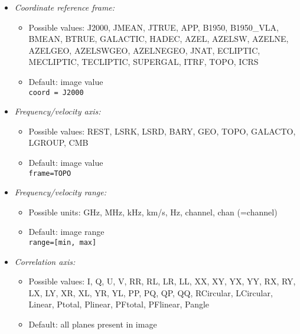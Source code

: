 \begin{itemize}

\item {\it Coordinate reference frame:}
\begin{itemize}

\item Possible values: J2000, JMEAN, JTRUE, APP, B1950, B1950\_VLA, BMEAN, BTRUE, GALACTIC, HADEC, AZEL, AZELSW, AZELNE, AZELGEO, AZELSWGEO, AZELNEGEO, JNAT, ECLIPTIC, MECLIPTIC, TECLIPTIC, SUPERGAL, ITRF, TOPO, ICRS 

\item Default: image value\\

{\tt coord = J2000}

\end{itemize}


\item {\it Frequency/velocity axis:}

\begin{itemize}

\item Possible values: REST, LSRK, LSRD, BARY, GEO, TOPO, GALACTO, LGROUP, CMB
\item Default: image value\\

{\tt frame=TOPO}
\end{itemize}


\item {\it Frequency/velocity range:}
\begin{itemize}

\item Possible units: GHz, MHz, kHz, km/s, Hz, channel, chan (=channel)
\item Default: image range\\

{\tt range=[min, max]}

\end{itemize}

\item {\it Correlation axis:}

\begin{itemize}
\item Possible values: I, Q, U, V, RR, RL, LR, LL, XX, XY, YX, YY, RX,
  RY, LX, LY, XR, XL, YR, YL, PP, PQ, QP, QQ, RCircular, LCircular,
  Linear, Ptotal, Plinear, PFtotal, PFlinear, Pangle 
\item Default: all planes present in image\\


\end{itemize}
\end{itemize}
